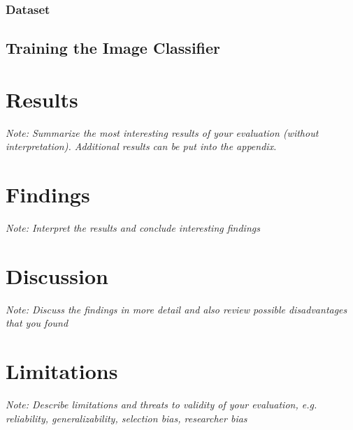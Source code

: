 \subsubsection{Dataset}

\subsection{Training the Image Classifier}


\section{Results}

\textit{Note: Summarize the most interesting results of your evaluation (without interpretation). Additional results can be put into the appendix.}

\section{Findings}

\textit{Note: Interpret the results and conclude interesting findings}

\section{Discussion}

\textit{Note: Discuss the findings in more detail and also review possible disadvantages that you found}

\section{Limitations}

\textit{Note: Describe limitations and threats to validity of your evaluation, e.g. reliability, generalizability, selection bias, researcher bias}